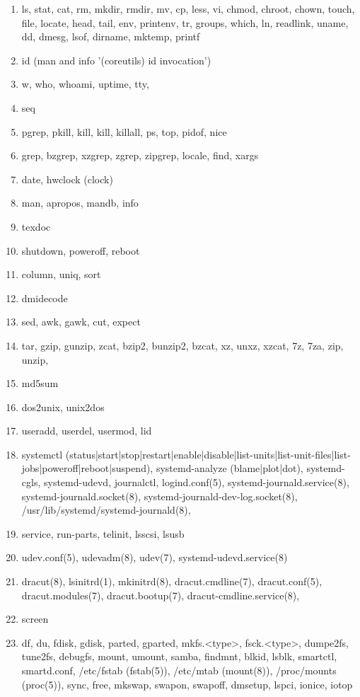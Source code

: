 \documentclass{article}
\begin{document}
\begin{enumerate}
\begin{enumerate}
            \item ls, stat, cat, rm, mkdir, rmdir, mv, cp, less, vi, chmod, chroot, chown, touch, file, locate, head, tail, env, printenv, tr, groups, which, ln, readlink, uname, dd, dmesg, lsof, dirname, mktemp, printf
            \item id (man and info '(coreutils) id invocation')
            \item w, who, whoami, uptime, tty,
            \item seq
            \item pgrep, pkill, kill, kill, killall, ps, top, pidof, nice
            \item grep, bzgrep, xzgrep, zgrep, zipgrep, locale, find, xargs
            \item date, hwclock (clock)
            \item man, apropos, mandb, info
            \item texdoc
            \item shutdown, poweroff, reboot
            \item column, uniq, sort
            \item dmidecode
            \item sed, awk, gawk, cut, expect
            \item tar, gzip, gunzip, zcat, bzip2, bunzip2, bzcat, xz, unxz, xzcat, 7z, 7za, zip, unzip,
            \item md5sum
            \item dos2unix, unix2dos
            \item useradd, userdel, usermod, lid
            \item systemctl (status|start|stop|restart|enable|disable|list-units|list-unit-files|list-jobs|poweroff|reboot|suspend), systemd-analyze (blame|plot|dot), systemd-cgls, systemd-udevd, journalctl, logind.conf(5), systemd-journald.service(8), systemd-journald.socket(8), systemd-journald-dev-log.socket(8), /usr/lib/systemd/systemd-journald(8),
            \item service, run-parts, telinit, lsscsi, lsusb
            \item udev.conf(5), udevadm(8), udev(7), systemd-udevd.service(8)
            \item dracut(8), lsinitrd(1), mkinitrd(8), dracut.cmdline(7), dracut.conf(5), dracut.modules(7), dracut.bootup(7), dracut-cmdline.service(8),
            \item screen
            \item df, du, fdisk, gdisk, parted, gparted, mkfs.<type>, fsck.<type>, dumpe2fs, tune2fs, debugfs, mount, umount, samba, findmnt, blkid, lsblk, smartctl, smartd.conf, /etc/fstab (fstab(5)), /etc/mtab (mount(8)), /proc/mounts (proc(5)), sync, free, mkswap, swapon, swapoff, dmsetup, lspci, ionice, iotop

\end{enumerate}
\end{enumerate}
\end{document}

